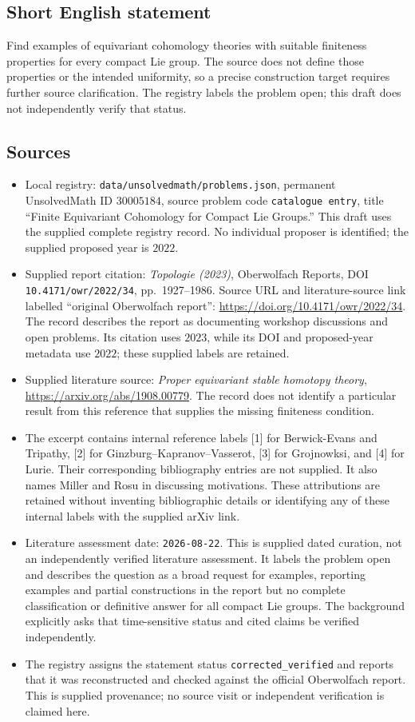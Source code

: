 \documentclass[11pt]{article}
\begin{document}
\subsection{Short English statement}
Find examples of equivariant cohomology theories with suitable finiteness properties for every compact Lie group. The source does not define those properties or the intended uniformity, so a precise construction target requires further source clarification. The registry labels the problem open; this draft does not independently verify that status.
\subsection{Sources}
\begin{itemize}
\item Local registry: \texttt{data/unsolvedmath/problems.json}, permanent UnsolvedMath ID \(30005184\), source problem code \texttt{catalogue entry}, title ``Finite Equivariant Cohomology for Compact Lie Groups.'' This draft uses the supplied complete registry record. No individual proposer is identified; the supplied proposed year is \(2022\).
\item Supplied report citation: \emph{Topologie (2023)}, Oberwolfach Reports, DOI \texttt{10.4171/owr/2022/34}, pp.~1927--1986. Source URL and literature-source link labelled ``original Oberwolfach report'': \url{https://doi.org/10.4171/owr/2022/34}. The record describes the report as documenting workshop discussions and open problems. Its citation uses \(2023\), while its DOI and proposed-year metadata use \(2022\); these supplied labels are retained.
\item Supplied literature source: \emph{Proper equivariant stable homotopy theory}, \url{https://arxiv.org/abs/1908.00779}. The record does not identify a particular result from this reference that supplies the missing finiteness condition.
\item The excerpt contains internal reference labels [1] for Berwick-Evans and Tripathy, [2] for Ginzburg--Kapranov--Vasserot, [3] for Grojnowksi, and [4] for Lurie. Their corresponding bibliography entries are not supplied. It also names Miller and Rosu in discussing motivations. These attributions are retained without inventing bibliographic details or identifying any of these internal labels with the supplied arXiv link.
\item Literature assessment date: \texttt{2026-08-22}. This is supplied dated curation, not an independently verified literature assessment. It labels the problem open and describes the question as a broad request for examples, reporting examples and partial constructions in the report but no complete classification or definitive answer for all compact Lie groups. The background explicitly asks that time-sensitive status and cited claims be verified independently.
\item The registry assigns the statement status \texttt{corrected\_verified} and reports that it was reconstructed and checked against the official Oberwolfach report. This is supplied provenance; no source visit or independent verification is claimed here.
\end{itemize}
\end{document}
